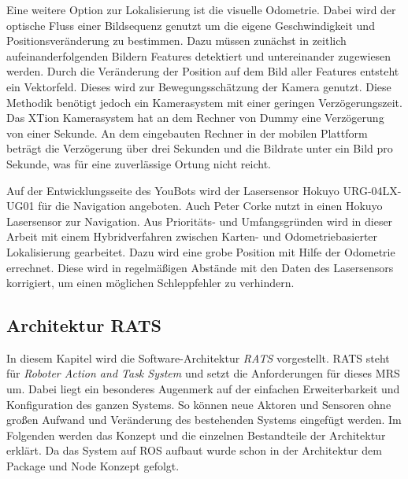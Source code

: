 Eine weitere Option zur Lokalisierung ist die visuelle Odometrie. Dabei wird der optische Fluss einer Bildsequenz genutzt um die eigene Geschwindigkeit und Positionsveränderung zu bestimmen. Dazu müssen zunächst in zeitlich aufeinanderfolgenden Bildern Features detektiert und untereinander zugewiesen werden. Durch die Veränderung der Position auf dem Bild aller Features entsteht ein Vektorfeld. Dieses wird zur Bewegungsschätzung der Kamera genutzt. Diese Methodik benötigt jedoch ein Kamerasystem mit einer geringen Verzögerungszeit. Das XTion Kamerasystem hat an dem Rechner von Dummy eine Verzögerung von einer Sekunde. An dem eingebauten Rechner in der mobilen Plattform beträgt die Verzögerung über drei Sekunden und die Bildrate unter ein Bild pro Sekunde, was für eine zuverlässige Ortung nicht reicht.

Auf der Entwicklungsseite des YouBots wird der Lasersensor Hokuyo URG-04LX-UG01 für die Navigation angeboten. Auch Peter Corke nutzt in \cite[Kapitel 6]{Corke2011} einen Hokuyo Lasersensor zur Navigation. Aus Prioritäts- und Umfangsgründen wird in dieser Arbeit mit einem Hybridverfahren zwischen Karten- und Odometriebasierter Lokalisierung gearbeitet. Dazu wird eine grobe Position mit Hilfe der Odometrie errechnet. Diese wird in regelmäßigen Abstände mit den Daten des Lasersensors korrigiert, um einen möglichen Schleppfehler zu verhindern.

\subsection{Architektur RATS}
In diesem Kapitel wird die Software-Architektur \textit{RATS} vorgestellt. RATS steht für \textit{Roboter Action and Task System} und setzt die Anforderungen für dieses MRS um. Dabei liegt ein besonderes Augenmerk auf der einfachen Erweiterbarkeit und Konfiguration des ganzen Systems. So können neue Aktoren und Sensoren ohne großen Aufwand und Veränderung des bestehenden Systems eingefügt werden. Im Folgenden werden das Konzept und die einzelnen Bestandteile der Architektur erklärt. Da das System auf ROS aufbaut wurde schon in der Architektur dem Package und Node Konzept gefolgt.

